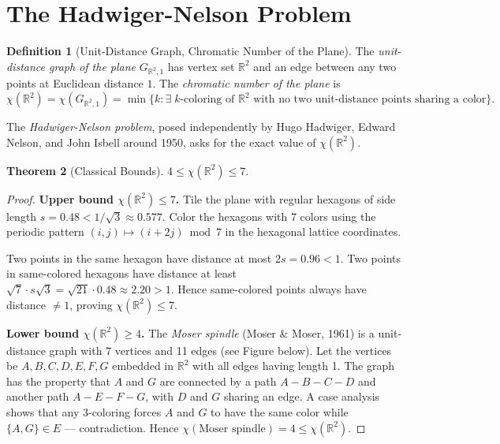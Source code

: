 \documentclass[12pt,a4paper]{amsart}
\newtheorem{theorem}{Theorem}[section]
\theoremstyle{definition}
\newtheorem{definition}[theorem]{Definition}
\theoremstyle{remark}
\newcommand{\R}{\mathbb{R}}
\newcommand{\chr}{\chi}
\begin{document}
\section{The Hadwiger-Nelson Problem}
\label{sec:hadwiger}

\begin{definition}[Unit-Distance Graph, Chromatic Number of the Plane]
The \emph{unit-distance graph of the plane} $G_{\R^2, 1}$ has vertex set
$\R^2$ and an edge between any two points at Euclidean distance $1$. The
\emph{chromatic number of the plane} is
\[
  \chr(\R^2) = \chr(G_{\R^2, 1})
  = \min\bigl\{k : \exists\; k\text{-coloring of } \R^2 \text{ with no two
    unit-distance points sharing a color}\bigr\}.
\]
\end{definition}

The \emph{Hadwiger-Nelson problem}, posed independently by Hugo Hadwiger,
Edward Nelson, and John Isbell around 1950, asks for the exact value of
$\chr(\R^2)$.

\begin{theorem}[Classical Bounds]
\label{thm:hn-classical}
$4 \le \chr(\R^2) \le 7.$
\end{theorem}

\begin{proof}
\textbf{Upper bound $\chr(\R^2) \le 7$.}
Tile the plane with regular hexagons of side length $s = 0.48 < 1/\sqrt{3}
\approx 0.577$. Color the hexagons with 7 colors using the periodic pattern
$(i,j) \mapsto (i + 2j) \bmod 7$ in the hexagonal lattice coordinates.

Two points in the same hexagon have distance at most $2s = 0.96 < 1$. Two
points in same-colored hexagons have distance at least $\sqrt{7} \cdot s\sqrt{3}
= \sqrt{21} \cdot 0.48 \approx 2.20 > 1$. Hence same-colored points always
have distance $\ne 1$, proving $\chr(\R^2) \le 7$.

\textbf{Lower bound $\chr(\R^2) \ge 4$.}
The \emph{Moser spindle} (Moser \& Moser, 1961) is a unit-distance graph
with 7 vertices and 11 edges (see Figure below). Let the vertices be
$A, B, C, D, E, F, G$ embedded in $\R^2$ with all edges having length 1.
The graph has the property that $A$ and $G$ are connected by a path
$A - B - C - D$ and another path $A - E - F - G$, with $D$ and $G$
sharing an edge. A case analysis shows that any 3-coloring forces $A$ and
$G$ to have the same color while $\{A, G\} \in E$ — contradiction. Hence
$\chr(\text{Moser spindle}) = 4 \le \chr(\R^2)$.
\end{proof}
\end{document}
